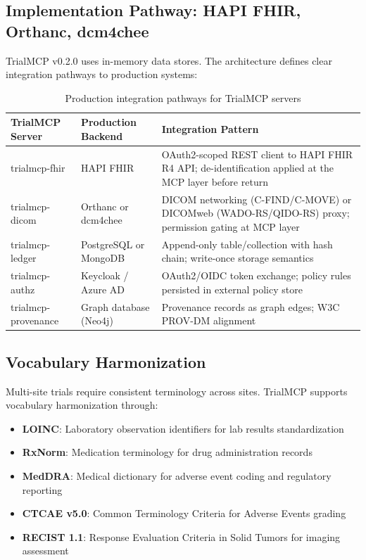 \documentclass[10pt,letterpaper]{article}
\begin{document}
\subsection{Implementation Pathway: HAPI FHIR, Orthanc, dcm4chee}

TrialMCP v0.2.0 uses in-memory data stores. The architecture defines clear integration pathways to production systems:

\begin{table}[H]
\centering
\caption{Production integration pathways for TrialMCP servers}
\label{tab:prodpath}
\small
\begin{tabularx}{\textwidth}{l l X}
\toprule
\textbf{TrialMCP Server} & \textbf{Production Backend} & \textbf{Integration Pattern} \\
\midrule
trialmcp-fhir & HAPI FHIR \cite{hapifhir} & OAuth2-scoped REST client to HAPI FHIR R4 API; de-identification applied at the MCP layer before return \\
trialmcp-dicom & Orthanc \cite{orthanc2024} or dcm4chee & DICOM networking (C-FIND/C-MOVE) or DICOMweb (WADO-RS/QIDO-RS) proxy; permission gating at MCP layer \\
trialmcp-ledger & PostgreSQL or MongoDB & Append-only table/collection with hash chain; write-once storage semantics \\
trialmcp-authz & Keycloak / Azure AD & OAuth2/OIDC token exchange; policy rules persisted in external policy store \\
trialmcp-provenance & Graph database (Neo4j) & Provenance records as graph edges; W3C PROV-DM alignment \\
\bottomrule
\end{tabularx}
\end{table}

\subsection{Vocabulary Harmonization}

Multi-site trials require consistent terminology across sites. TrialMCP supports vocabulary harmonization through:

\begin{itemize}[leftmargin=2em]
    \item \textbf{LOINC}: Laboratory observation identifiers for lab results standardization
    \item \textbf{RxNorm}: Medication terminology for drug administration records
    \item \textbf{MedDRA}: Medical dictionary for adverse event coding and regulatory reporting
    \item \textbf{CTCAE v5.0}: Common Terminology Criteria for Adverse Events grading
    \item \textbf{RECIST 1.1}: Response Evaluation Criteria in Solid Tumors for imaging assessment
\end{itemize}
\end{document}
